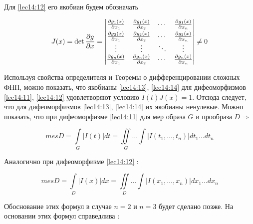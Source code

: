 \documentclass[../../main.tex]{subfiles}
\begin{document}
	
	Для \eqref{lec14:12} его якобиан будем обозначать 
	
	\begin{equation}
	\label{lec14:14}
	J(x) = \det \frac{\partial g}{\partial x}=
	\begin{vmatrix}
	\smallskip
	\frac{\partial g_1\left(x \right)}{\partial x_1} & \frac{\partial g_1\left(x \right)}{\partial x_2}
	& \cdots & \frac{\partial g_1\left(x \right)}{\partial x_n} \\
	\frac{\partial g_2\left(x \right)}{\partial x_1} & \frac{\partial g_2\left(x \right)}{\partial x_2} 
	& \cdots & \frac{\partial g_2\left(x \right)}{\partial x_n} \\
	\vdots  & \vdots  & \ddots & \vdots  \\
	\frac{\partial g_n\left(x \right)}{\partial x_1} & \frac{\partial g_n\left(x \right)}{\partial x_2}
	& \cdots & \frac{\partial g_n\left(x \right)}{\partial x_n}
	\end{vmatrix} \ne 0
	\end{equation}
	
	Используя свойства определителя и Теоремы о дифференцировании сложных ФНП, можно
	показать, что якобианы \eqref{lec14:13}, \eqref{lec14:14} для дифеоморфизмов \eqref{lec14:11}, \eqref{lec14:12}
	удовлетворяют условию $I(t) J(x) = 1$.
	Отсюда следует, что для дифеоморфизмов \eqref{lec14:13}, \eqref{lec14:14} 
	их якобианы ненулевые. Можно показать, что 
	при дифеоморфизме \eqref{lec14:11} для мер образа $G$ и прообраза $D\Rightarrow$
	
	\begin{equation}
	\label{lec14:15}
	mes D = \int\limits_G \left| 
	I(t) \right|dt = \iint\limits_G \ldots \int\limits \left| 
	I\left( t_1, \ldots, t_n\right) \right| dt_1\ldots dt_n
	\end{equation} 
	
	Аналогично при дифеоморфизме \eqref{lec14:12} :
	
	\begin{equation}
	\label{lec14:16}
	mes D = \int\limits_D \left| 
	I(x) \right| dx = \iint\limits_D \ldots \int\limits \left| 
	I\left( x_1, \ldots, x_n\right) \right| dx_1\ldots dx_n
	\end{equation}
	
	Обоснование этих формул в случае $n = 2$ и $n = 3$ будет 
	сделано позже. На основании этих формул справедлива :
	
\end{document}
